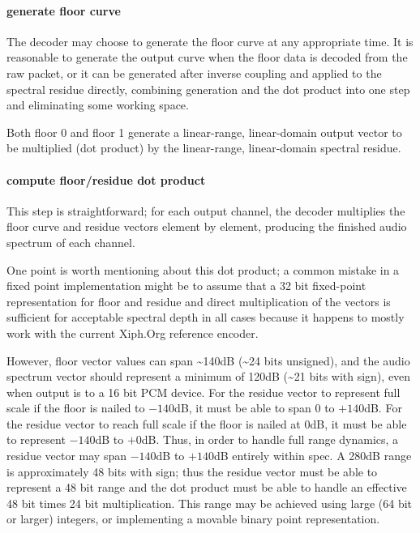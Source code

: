 \paragraph{generate floor curve}

The decoder may choose to generate the floor curve at any appropriate
time.  It is reasonable to generate the output curve when the floor
data is decoded from the raw packet, or it can be generated after
inverse coupling and applied to the spectral residue directly,
combining generation and the dot product into one step and eliminating
some working space.

Both floor 0 and floor 1 generate a linear-range, linear-domain output
vector to be multiplied (dot product) by the linear-range,
linear-domain spectral residue.



\paragraph{compute floor/residue dot product}

This step is straightforward; for each output channel, the decoder
multiplies the floor curve and residue vectors element by element,
producing the finished audio spectrum of each channel.

One point is worth mentioning about this dot product; a common mistake
in a fixed point implementation might be to assume that a 32 bit
fixed-point representation for floor and residue and direct
multiplication of the vectors is sufficient for acceptable spectral
depth in all cases because it happens to mostly work with the current
Xiph.Org reference encoder.

However, floor vector values can span \~{}140dB (\~{}24 bits unsigned), and
the audio spectrum vector should represent a minimum of 120dB (\~{}21
bits with sign), even when output is to a 16 bit PCM device.  For the
residue vector to represent full scale if the floor is nailed to
$-140$dB, it must be able to span 0 to $+140$dB.  For the residue vector
to reach full scale if the floor is nailed at 0dB, it must be able to
represent $-140$dB to $+0$dB.  Thus, in order to handle full range
dynamics, a residue vector may span $-140$dB to $+140$dB entirely within
spec.  A 280dB range is approximately 48 bits with sign; thus the
residue vector must be able to represent a 48 bit range and the dot
product must be able to handle an effective 48 bit times 24 bit
multiplication.  This range may be achieved using large (64 bit or
larger) integers, or implementing a movable binary point
representation.



